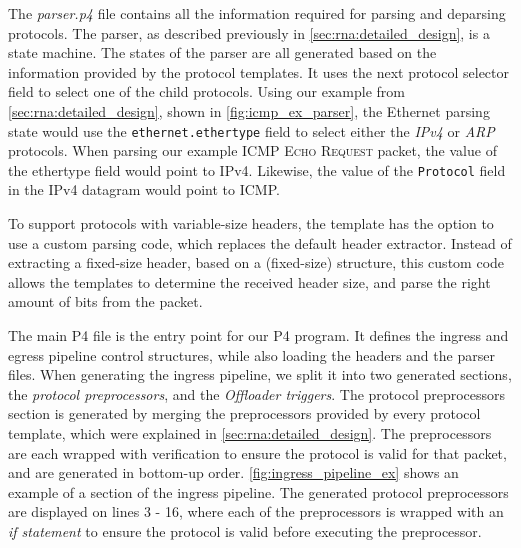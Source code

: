 The \textit{parser.p4} file contains all the information required for parsing and deparsing protocols. The parser, as described previously in \autoref{sec:rna:detailed_design}, is a state machine. The states of the parser are all generated based on the information provided by the protocol templates. It uses the next protocol selector field to select one of the child protocols. Using our example from \autoref{sec:rna:detailed_design}, shown in \autoref{fig:icmp_ex_parser}, the Ethernet parsing state would use the \texttt{ethernet.ethertype} field to select either the \textit{IPv4} or \textit{ARP} protocols. When parsing our example \textsc{ICMP Echo Request} packet, the value of the ethertype field would point to IPv4. Likewise, the value of the \texttt{Protocol} field in the IPv4 datagram would point to ICMP.

To support protocols with variable-size headers, the template has the option to use a custom parsing code, which replaces the default header extractor. Instead of extracting a fixed-size header, based on a (fixed-size) structure, this custom code allows the templates to determine the received header size, and parse the right amount of bits from the packet.


The main P4 file is the entry point for our P4 program. It defines the ingress and egress pipeline control structures, while also loading the headers and the parser files. When generating the ingress pipeline, we split it into two generated sections, the \textit{protocol preprocessors}, and the \textit{Offloader triggers}. The protocol preprocessors section is generated by merging the preprocessors provided by every protocol template, which were explained in \autoref{sec:rna:detailed_design}. The preprocessors are each wrapped with verification to ensure the protocol is valid for that packet, and are generated in bottom-up order. \autoref{fig:ingress_pipeline_ex} shows an example of a section of the ingress pipeline. The generated protocol preprocessors are displayed on lines 3 - 16, where each of the preprocessors is wrapped with an \textit{if statement} to ensure the protocol is valid before executing the preprocessor.

